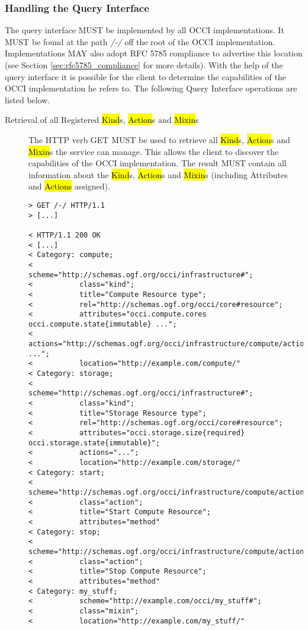 \documentclass[10pt,a4paper]{article}
\begin{document}
\subsubsection{Handling the Query Interface}
\label{sec:query}
The query interface MUST be implemented by all OCCI
implementations. It MUST be found at the path \emph{/-/} off the root
of the OCCI implementation. Implementations MAY also adopt RFC 5785
\cite{rfc5785} compliance to advertise this location (see Section
\ref{sec:rfc5785_compliance} for more details).  With the help of the
query interface it is possible for the client to determine the
capabilities of the OCCI implementation he refers to. The following
Query Interface operations are listed below.

\begin{description}
  \item[Retrieval of all Registered \hl{Kind}s, \hl{Action}s and
    \hl{Mixin}s] The HTTP verb GET MUST be used to retrieve all
    \hl{Kind}s, \hl{Action}s and \hl{Mixin}s the service can
    manage. This allows the client to discover the capabilities of the
    OCCI implementation. The result MUST contain all information about
    the \hl{Kind}s, \hl{Action}s and \hl{Mixin}s (including Attributes
    and \hl{Actions} assigned).

\begin{verbatim}
> GET /-/ HTTP/1.1
> [...]

< HTTP/1.1 200 OK
< [...]
< Category: compute;
<           scheme="http://schemas.ogf.org/occi/infrastructure#";
<           class="kind";
<           title="Compute Resource type";
<           rel="http://schemas.ogf.org/occi/core#resource";
<           attributes="occi.compute.cores occi.compute.state{immutable} ...";
<           actions="http://schemas.ogf.org/occi/infrastructure/compute/action#stop ...";
<           location="http://example.com/compute/"
< Category: storage;
<           scheme="http://schemas.ogf.org/occi/infrastructure#";
<           class="kind";
<           title="Storage Resource type";
<           rel="http://schemas.ogf.org/occi/core#resource";
<           attributes="occi.storage.size{required} occi.storage.state{immutable}";
<           actions="...";
<           location="http://example.com/storage/"
< Category: start;
<           scheme="http://schemas.ogf.org/occi/infrastructure/compute/action#";
<           class="action";
<           title="Start Compute Resource";
<           attributes="method"
< Category: stop;
<           scheme="http://schemas.ogf.org/occi/infrastructure/compute/action#";
<           class="action";
<           title="Stop Compute Resource";
<           attributes="method"
< Category: my_stuff;
<           scheme="http://example.com/occi/my_stuff#";
<           class="mixin";
<           location="http://example.com/my_stuff/"
\end{verbatim}


\end{description}
\end{document}
